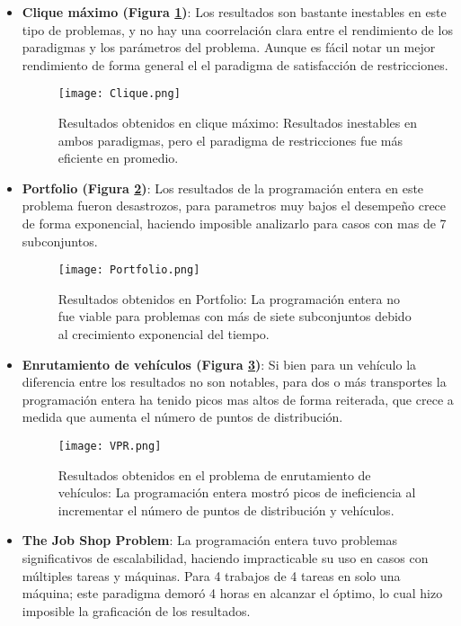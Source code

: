 \documentclass[12pt]{report}
\begin{document}
\begin{itemize}
    \item \textbf{Clique máximo (Figura \ref{fig:Clique})}: Los resultados son bastante inestables en este tipo de problemas, y no hay una coorrelación clara entre el rendimiento de los paradigmas y los parámetros del problema. Aunque es fácil notar un mejor rendimiento de forma general el el paradigma de satisfacción de restricciones. 
    \begin{figure}[ht]
    \centering
    \texttt{[image: Clique.png]}
    \caption{Resultados obtenidos en clique máximo: Resultados inestables en ambos paradigmas, pero el paradigma de restricciones fue más eficiente en promedio.}
    \label{fig:Clique}
    \end{figure}


    \item \textbf{Portfolio (Figura \ref{fig:Portfolio})}: Los resultados de la programación entera en este problema fueron desastrozos, para parametros muy bajos el desempeño crece de forma exponencial, haciendo imposible analizarlo para casos con mas de 7 subconjuntos.
    \begin{figure}[ht]
    \centering
    \texttt{[image: Portfolio.png]}
    \caption{Resultados obtenidos en Portfolio: La programación entera no fue viable para problemas con más de siete subconjuntos debido al crecimiento exponencial del tiempo.}
    \label{fig:Portfolio}
    \end{figure}


    \item \textbf{Enrutamiento de vehículos (Figura \ref{fig:VPR})}: Si bien para un vehículo la diferencia entre los resultados no son notables, para dos o más transportes la programación entera ha tenido picos mas altos de forma reiterada, que crece a medida que aumenta el número de puntos de distribución.
    \begin{figure}[ht]
    \centering
    \texttt{[image: VPR.png]}
    \caption{Resultados obtenidos en el problema de enrutamiento de vehículos: La programación entera mostró picos de ineficiencia al incrementar el número de puntos de distribución y vehículos.}
    \label{fig:VPR}
    \end{figure}

    
    \item \textbf{The Job Shop Problem}: La programación entera tuvo problemas significativos de escalabilidad, haciendo impracticable su uso en casos con múltiples tareas y máquinas. Para 4 trabajos de 4 tareas en solo una máquina; este paradigma demoró 4 horas en alcanzar el óptimo, lo cual hizo imposible la graficación de los resultados.



\end{itemize}
\end{document}
